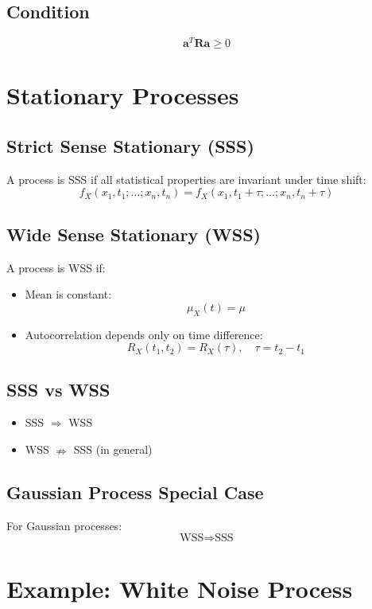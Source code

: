 \documentclass[11pt]{article}
\begin{document}
\subsection{Condition}
\[
\mathbf{a}^T \mathbf{R} \mathbf{a} \geq 0
\]

\section{Stationary Processes}

\subsection{Strict Sense Stationary (SSS)}

A process is SSS if all statistical properties are invariant under time shift:
\[
f_X(x_1, t_1; \dots; x_n, t_n) = f_X(x_1, t_1+\tau; \dots; x_n, t_n+\tau)
\]

\subsection{Wide Sense Stationary (WSS)}

A process is WSS if:

\begin{itemize}
    \item Mean is constant:
    \[
    \mu_X(t) = \mu
    \]
    
    \item Autocorrelation depends only on time difference:
    \[
    R_X(t_1,t_2) = R_X(\tau), \quad \tau = t_2 - t_1
    \]
\end{itemize}

\subsection{SSS vs WSS}

\begin{itemize}
    \item SSS $\Rightarrow$ WSS
    \item WSS $\nRightarrow$ SSS (in general)
\end{itemize}

\subsection{Gaussian Process Special Case}

For Gaussian processes:
\[
\text{WSS} \Rightarrow \text{SSS}
\]

\section{Example: White Noise Process}
\end{document}
